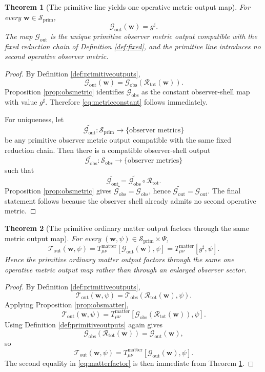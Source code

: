 \documentclass[11pt]{article}
\newcommand{\CompletedMetric}{g^{\sharp}}
\newcommand{\ReductionTriple}{\mathcal R_{\mathrm{tot}}}
\newcommand{\PrimShell}{\mathcal S_{\mathrm{prim}}}
\newcommand{\ObsShell}{\mathcal S_{\mathrm{obs}}}
\newcommand{\MetricOut}{\mathscr G_{\mathrm{out}}}
\newcommand{\MatterOut}{\mathscr T_{\mathrm{out}}}
\newcommand{\ObsMetricOut}{\mathscr G_{\mathrm{obs}}}
\newcommand{\ObsMatterOut}{\mathscr T_{\mathrm{obs}}}
\newtheorem{theorem}{Theorem}
\begin{document}
\begin{theorem}[The primitive line yields one operative metric output map]
\label{thm:metric}
For every \(\mathbf w\in\PrimShell\),
\begin{equation}
\MetricOut(\mathbf w)=\CompletedMetric.
\label{eq:metricconstant}
\end{equation}
The map \(\MetricOut\) is the unique primitive observer metric output compatible with the fixed reduction chain of Definition \ref{def:fixed}, and the primitive line introduces no second operative observer metric.
\end{theorem}

\begin{proof}
By Definition \ref{def:primitiveoutputs},
\[
\MetricOut(\mathbf w)
=
\ObsMetricOut(\ReductionTriple(\mathbf w)).
\]
Proposition \ref{prop:obsmetric} identifies \(\ObsMetricOut\) as the constant observer-shell map with value \(\CompletedMetric\). Therefore \eqref{eq:metricconstant} follows immediately.

For uniqueness, let
\[
\widetilde{\MetricOut}:\PrimShell\to\{\text{observer metrics}\}
\]
be any primitive observer metric output compatible with the same fixed reduction chain. Then there is a compatible observer-shell output
\[
\widetilde{\ObsMetricOut}:\ObsShell\to\{\text{observer metrics}\}
\]
such that
\[
\widetilde{\MetricOut}
=
\widetilde{\ObsMetricOut}\circ\ReductionTriple.
\]
Proposition \ref{prop:obsmetric} gives \(\widetilde{\ObsMetricOut}=\ObsMetricOut\), hence \(\widetilde{\MetricOut}=\MetricOut\). The final statement follows because the observer shell already admits no second operative metric.
\end{proof}

\begin{theorem}[The primitive ordinary matter output factors through the same metric output map]
\label{thm:matter}
For every \((\mathbf w,\psi)\in\PrimShell\times\Psi\),
\begin{equation}
\MatterOut(\mathbf w,\psi)
=
T_{\mu\nu}^{\mathrm{matter}}[\MetricOut(\mathbf w),\psi]
=
T_{\mu\nu}^{\mathrm{matter}}[\CompletedMetric,\psi].
\label{eq:matterfactor}
\end{equation}
Hence the primitive ordinary matter output factors through the same one operative metric output map rather than through an enlarged observer sector.
\end{theorem}

\begin{proof}
By Definition \ref{def:primitiveoutputs},
\[
\MatterOut(\mathbf w,\psi)
=
\ObsMatterOut(\ReductionTriple(\mathbf w),\psi).
\]
Applying Proposition \ref{prop:obsmatter},
\[
\MatterOut(\mathbf w,\psi)
=
T_{\mu\nu}^{\mathrm{matter}}[\ObsMetricOut(\ReductionTriple(\mathbf w)),\psi].
\]
Using Definition \ref{def:primitiveoutputs} again gives
\[
\ObsMetricOut(\ReductionTriple(\mathbf w))
=
\MetricOut(\mathbf w),
\]
so
\[
\MatterOut(\mathbf w,\psi)
=
T_{\mu\nu}^{\mathrm{matter}}[\MetricOut(\mathbf w),\psi].
\]
The second equality in \eqref{eq:matterfactor} is then immediate from Theorem \ref{thm:metric}.
\end{proof}
\end{document}
